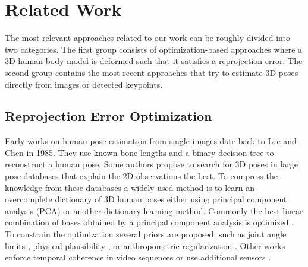 \documentclass[10pt,twocolumn,letterpaper]{article}
\begin{document}
\section{Related Work}
The most relevant approaches related to our work can be roughly divided into two categories.
The first group consists of optimization-based approaches where a 3D human body model is deformed such that it satisfies a reprojection error.
The second group contains the most recent approaches that try to estimate 3D poses directly from images or detected keypoints.


\subsection{Reprojection Error Optimization}
Early works on human pose estimation from single images date back to Lee and Chen \cite{Lee1985} in 1985. 
They use known bone lengths and a binary decision tree to reconstruct a human pose.
Some authors \cite{Jiang2010,Gupta2014,ChenR17} propose to search for 3D poses in large pose databases that explain the 2D observations the best.
To compress the knowledge from these databases a widely used method is to learn an overcomplete dictionary of 3D human poses either using principal component analysis (PCA) or another dictionary learning method.
Commonly the best linear combination of bases obtained by a principal component analysis is optimized \cite{ChenC09,Wei2009,ZhouConvexRelax2016,Zhou2016}.
To constrain the optimization several priors are proposed, such as joint angle limits \cite{Akhter2015}, physical plausibility \cite{ZelWan2017}, or anthropometric regularization \cite{Ramakrishna12,SimoSerraRATM12,Wang2014}.
Other works enforce temporal coherence in video sequences \cite{Wandt2016, AllKas2017, WanAck2018a,ZelWan2017} or use additional sensors \cite{Marcard2016,Marcard2017,Marcard2018}.
\end{document}
